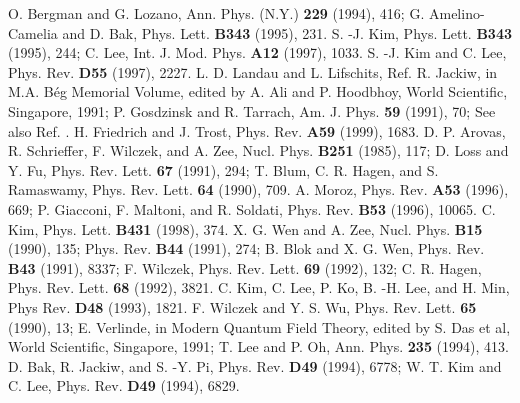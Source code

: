 \documentclass[a4paper,aps,eqsecnum,preprint,preprintnumbers,12pt]{revtex4}
\begin{document}
\begin{thebibliography}{12345}
 O. Bergman and G. Lozano, Ann. Phys. (N.Y.) {\bf
229} (1994), 416; G. Amelino-Camelia and D. Bak, Phys. Lett. {\bf
B343} (1995), 231.
 S. -J. Kim, Phys. Lett. {\bf B343} (1995), 244; C.
Lee, Int. J. Mod. Phys. {\bf A12} (1997), 1033.
 S. -J. Kim and C. Lee, Phys. Rev. {\bf D55} (1997),
2227.
 L. D. Landau and L. Lifschits, Ref. \cite{langer}
 R. Jackiw, in M.A. B\'{e}g Memorial Volume,
edited by A. Ali and P. Hoodbhoy, World Scientific, Singapore,
1991; P. Gosdzinsk and R. Tarrach, Am. J. Phys. {\bf 59} (1991),
70; See also Ref. \cite{albeverio}.
 H. Friedrich and J. Trost, Phys. Rev. {\bf
A59} (1999), 1683.
 D. P. Arovas, R. Schrieffer, F. Wilczek, and A.
Zee, Nucl. Phys. {\bf B251} (1985), 117; D. Loss and Y. Fu, Phys.
Rev. Lett. {\bf 67} (1991), 294; T. Blum, C. R. Hagen, and S.
Ramaswamy, Phys. Rev. Lett. {\bf 64} (1990), 709.
 A. Moroz, Phys. Rev. {\bf A53} (1996), 669; P.
Giacconi, F. Maltoni, and R. Soldati, Phys. Rev. {\bf B53} (1996),
10065.
 C. Kim, Phys. Lett. {\bf B431} (1998), 374.
 X. G. Wen and A. Zee, Nucl. Phys. {\bf B15} (1990),
135; Phys. Rev. {\bf B44} (1991), 274; B. Blok and X. G. Wen,
Phys. Rev. {\bf B43} (1991), 8337; F. Wilczek, Phys. Rev. Lett.
{\bf 69} (1992), 132; C. R. Hagen, Phys. Rev. Lett. {\bf 68}
(1992), 3821.
 C. Kim, C. Lee, P. Ko, B. -H. Lee, and H. Min, Phys
Rev. {\bf D48} (1993), 1821.
 F. Wilczek and Y. S. Wu, Phys. Rev. Lett. {\bf
65} (1990), 13; E. Verlinde, in Modern Quantum Field Theory,
edited by S. Das et al, World Scientific, Singapore, 1991; T. Lee
and P. Oh, Ann. Phys. {\bf 235} (1994), 413.
 D. Bak, R. Jackiw, and S. -Y. Pi, Phys. Rev. {\bf
D49} (1994), 6778; W. T. Kim and C. Lee, Phys. Rev. {\bf D49}
(1994), 6829.
\end{thebibliography}
\end{document}
